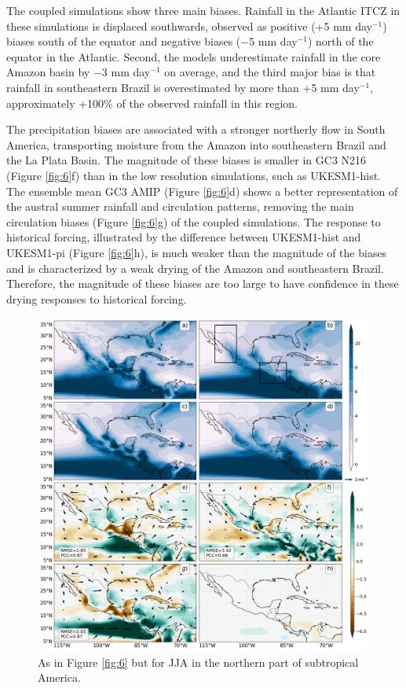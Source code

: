  

   The coupled simulations show three main biases.
Rainfall in the Atlantic ITCZ in these simulations is displaced southwards, observed as positive (+5 mm day$^{-1}$) biases south of the equator and negative biases ($-$5 mm day$^{-1}$) north of the equator in the Atlantic.
Second, the models underestimate rainfall in the core Amazon basin by $-$3 mm day$^{-1}$ on average, and the third major bias is that rainfall in southeastern Brazil is overestimated by more than +5 mm day$^{-1}$, approximately +100\% of the observed rainfall in this region.  

 The precipitation biases are associated with a stronger northerly flow in South America, transporting moisture from the Amazon into southeastern Brazil and the La Plata Basin.   
The magnitude of these biases is smaller in GC3 N216 (Figure \ref{fig:6}f) than in the low resolution simulations, such as UKESM1-hist.   The ensemble mean GC3 AMIP (Figure \ref{fig:6}d) shows a better representation of the austral summer rainfall and circulation patterns, removing the main circulation biases (Figure \ref{fig:6}g) of the coupled simulations.   
The response to historical forcing, illustrated by the difference between UKESM1-hist and UKESM1-pi (Figure \ref{fig:6}h), is much weaker than the magnitude of the biases and is characterized by a weak drying of the Amazon and southeastern Brazil. Therefore, the magnitude of these biases are too large to have confidence in these drying responses to historical forcing. 


\begin{figure}
\centering
 \includegraphics[width=\linewidth]{figures/Fig8.png}
\caption[Boreal summer precipitation in the North American Monsoon]{ As in Figure \ref{fig:6} but for JJA in the northern part of subtropical America.   }
\label{fig:7}
\end{figure}

